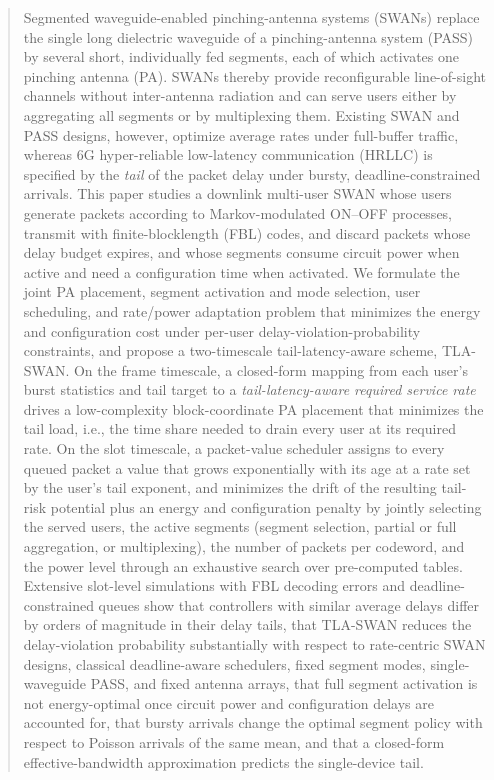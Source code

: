 \documentclass[journal]{IEEEtran}
\begin{document}
\begin{abstract}
Segmented waveguide-enabled pinching-antenna systems (SWANs) replace the single long dielectric waveguide of a pinching-antenna system (PASS) by several short, individually fed segments, each of which activates one pinching antenna (PA). SWANs thereby provide reconfigurable line-of-sight channels without inter-antenna radiation and can serve users either by aggregating all segments or by multiplexing them. Existing SWAN and PASS designs, however, optimize average rates under full-buffer traffic, whereas 6G hyper-reliable low-latency communication (HRLLC) is specified by the \emph{tail} of the packet delay under bursty, deadline-constrained arrivals. This paper studies a downlink multi-user SWAN whose users generate packets according to Markov-modulated ON--OFF processes, transmit with finite-blocklength (FBL) codes, and discard packets whose delay budget expires, and whose segments consume circuit power when active and need a configuration time when activated. We formulate the joint PA placement, segment activation and mode selection, user scheduling, and rate/power adaptation problem that minimizes the energy and configuration cost under per-user delay-violation-probability constraints, and propose a two-timescale tail-latency-aware scheme, TLA-SWAN. On the frame timescale, a closed-form mapping from each user's burst statistics and tail target to a \emph{tail-latency-aware required service rate} drives a low-complexity block-coordinate PA placement that minimizes the tail load, i.e., the time share needed to drain every user at its required rate. On the slot timescale, a packet-value scheduler assigns to every queued packet a value that grows exponentially with its age at a rate set by the user's tail exponent, and minimizes the drift of the resulting tail-risk potential plus an energy and configuration penalty by jointly selecting the served users, the active segments (segment selection, partial or full aggregation, or multiplexing), the number of packets per codeword, and the power level through an exhaustive search over pre-computed tables. Extensive slot-level simulations with FBL decoding errors and deadline-constrained queues show that controllers with similar average delays differ by orders of magnitude in their delay tails, that TLA-SWAN reduces the delay-violation probability substantially with respect to rate-centric SWAN designs, classical deadline-aware schedulers, fixed segment modes, single-waveguide PASS, and fixed antenna arrays, that full segment activation is not energy-optimal once circuit power and configuration delays are accounted for, that bursty arrivals change the optimal segment policy with respect to Poisson arrivals of the same mean, and that a closed-form effective-bandwidth approximation predicts the single-device tail.
\end{abstract}
\end{document}
